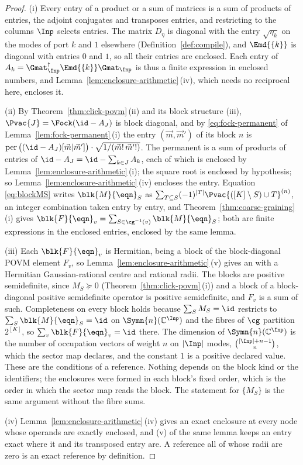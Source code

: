\begin{proof}
(i) Every entry of a product or a sum of matrices is a sum of products of
entries, the adjoint conjugates and transposes entries, and restricting to
the columns $\Inp$ selects entries. The matrix $D_\eta$ is diagonal with the
entry $\sqrt{\eta_k}$ on the modes of port $k$ and $1$ elsewhere
(Definition~\ref{def:compile}), and $\Emd{\{k\}}$ is diagonal with entries
$0$ and $1$, so all their entries are enclosed. Each entry of
$A_k=\Gmat_{\Inp}^{\dagger}\Emd{\{k\}}\Gmat_{\Inp}$ is thus a finite
expression in enclosed numbers, and
Lemma~\ref{lem:enclosure-arithmetic}\,(iv), which needs no reciprocal here,
encloses it.

(ii) By Theorem~\ref{thm:click-povm}\,(ii) and its block structure (iii),
$\Pvac{J}=\Fock(\id-A_J)$ is block diagonal, and by
\eqref{eq:fock-permanent} of Lemma~\ref{lem:fock-permanent}\,(i) the entry
$(\vec m,\vec m')$ of its block $n$ is
$\operatorname{per}\big((\id-A_J)[\vec m|\vec m']\big)\cdot
\sqrt{1/(\vec m!\,\vec m'!)}$. The permanent is a sum of products of entries
of $\id-A_J=\id-\sum_{k\in J}A_k$, each of which is enclosed by
Lemma~\ref{lem:enclosure-arithmetic}\,(i); the square root is enclosed by
hypothesis; so Lemma~\ref{lem:enclosure-arithmetic}\,(iv) encloses the entry.
Equation \eqref{eq:blockMS} writes $\blk{M}{\eqn}_S$ as
$\sum_{T\subseteq S}(-1)^{|T|}\Pvac{([K]\setminus S)\cup T}^{(n)}$, an
integer combination taken entry by entry, and
Theorem~\ref{thm:coarse-graining}\,(i) gives
$\blk{F}{\eqn}_v=\sum_{S\in\cg^{-1}(v)}\blk{M}{\eqn}_S$; both are finite
expressions in the enclosed entries, enclosed by the same lemma.

(iii) Each $\blk{F}{\eqn}_v$ is Hermitian, being a block of the
block-diagonal POVM element $F_v$, so
Lemma~\ref{lem:enclosure-arithmetic}\,(v) gives an
 with a Hermitian Gaussian-rational centre and
rational radii. The blocks are positive semidefinite, since
$M_S\succeq0$ (Theorem~\ref{thm:click-povm}\,(i)) and a block of a
block-diagonal positive semidefinite operator is positive semidefinite, and
$F_v$ is a sum of such. Completeness on every block holds because
$\sum_SM_S=\id$ restricts to $\sum_S\blk{M}{\eqn}_S=\id$ on
$\Symn{n}(\mathbb{C}^{\Inp})$ and the fibres of $\cg$ partition $2^{[K]}$, so
$\sum_v\blk{F}{\eqn}_v=\id$ there. The dimension of
$\Symn{n}(\mathbb{C}^{\Inp})$ is the number of occupation vectors of weight
$n$ on $|\Inp|$ modes, $\binom{|\Inp|+n-1}{n}$, which the sector map
declares, and the constant $1$ is a positive declared value. These are the
conditions of a reference. Nothing depends on the block kind or the
identifiers; the enclosures were formed in each block's fixed order, which is
the order in which the sector map reads the block. The statement for
$\{M_S\}$ is the same argument without the fibre sums.

(iv) Lemma~\ref{lem:enclosure-arithmetic}\,(iv) gives an exact enclosure at
every node whose operands are exactly enclosed, and (v) of the same lemma
keeps an entry exact where it and its transposed entry are. A reference all
of whose radii are zero is an exact reference by definition.
\end{proof}
